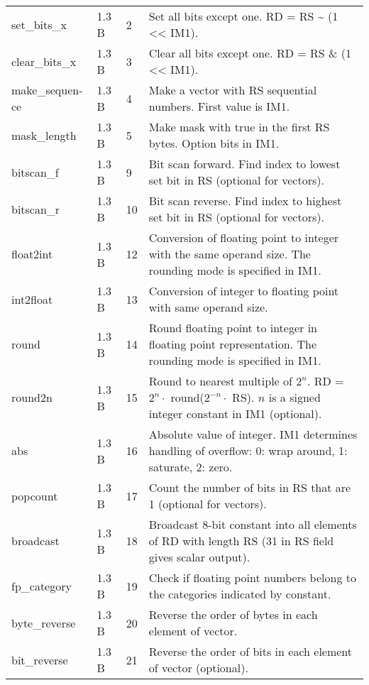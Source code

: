 \documentclass[forwardcom.tex]{subfiles}
\begin{document}
\begin{longtable} {|p{20mm}|p{10mm}|p{8mm}|p{75mm}|}
set\_bits\_x   & 1.3 B &  2 & Set all bits except one. RD = RS \textbar{} \~{} (1 \textless\textless{} IM1). \\

clear\_bits\_x & 1.3 B &  3 & Clear all bits except one. RD = RS \& (1 \textless\textless{} IM1). \\

make\_sequen-ce& 1.3 B &  4 & Make a vector with RS sequential numbers. First value is IM1. \\

mask\_length  & 1.3 B &  5 & Make mask with true in the first RS bytes. Option bits in IM1. \\

bitscan\_f    & 1.3 B &  9 & Bit scan forward. Find index to lowest set bit in RS (optional for vectors). \\
bitscan\_r    & 1.3 B & 10 & Bit scan reverse. Find index to highest set bit in RS (optional for vectors). \\

float2int     & 1.3 B & 12 & Conversion of floating point to integer with the same operand size. The rounding mode is specified in IM1. \\
int2float     & 1.3 B & 13 & Conversion of integer to floating point with same operand size. \\

round         & 1.3 B & 14 & Round floating point to integer in floating point  representation. The rounding mode is specified in IM1. \\
round2n       & 1.3 B & 15 & Round to nearest multiple of $2^n$. \newline 
RD = $2^n\cdot$ round($2^{-n}\cdot$ RS). $n$ is a signed integer constant in IM1 (optional). \\
abs           & 1.3 B & 16 & Absolute value of integer. IM1 determines handling of overflow: 0: wrap around, 1: saturate, 2: zero. \\
popcount      & 1.3 B & 17 & Count the number of bits in RS that are 1 (optional for vectors). \\
broadcast     & 1.3 B & 18 & Broadcast 8-bit constant into all elements of RD with length RS (31 in RS field gives scalar output). \\
fp\_category  & 1.3 B & 19 & Check if floating point numbers belong to the categories indicated by constant. \\
byte\_reverse & 1.3 B & 20 & Reverse the order of bytes in each element of vector. \\
bit\_reverse  & 1.3 B & 21 & Reverse the order of bits in each element of vector (optional). \\


\end{longtable}
\end{document}
